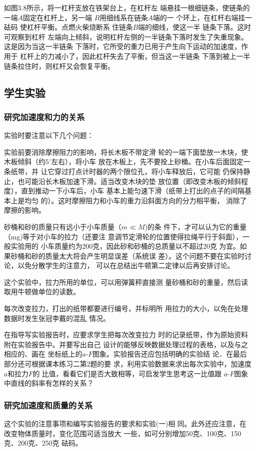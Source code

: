 如图3.8所示，将一杠杆支放在铁架台上，在杠杆左
端悬挂一根细链条，使链条的
一端$A$固定在杠杆上，另一端
$B$用细线系在链条$A$端的一
个环上，在杠杆右端挂一砝码
使杠杆平衡。点燃火柴烧断系
住链条$B$端的细线，使这一半
链条下落。这时可观察到杠杆
左端向上倾斜，说明杠杆左侧的一半链条下落时发生了失重现象。这是因为当这一半链条
下落时，它所受的重力已用于产生向下运动的加速度，作用于
杠杆上的力减小了，因此杠杆失去了平衡，但当这一半链条
下落到被上一半链条拉住时，则杠杆又会恢复平衡。

\subsection{学生实验}
\subsubsection{研究加速度和力的关系}
实验时要注意以下几个问题：

实验前要消除摩擦阻力的影响，将长木板不带定滑
轮的一端下面垫放一木块，使木板倾斜（约$5^{\circ}$左右），将小车
放在木板上，先不要拴上砂桶。在小车后面固定一条纸带，并
让它穿过打点计时器的两个限位孔，将小车释放后，它可能
仍保持静止，也可能沿长木板加速下滑。适当改变木块的垫
放位置（即改变木板的倾斜程度），直到推动一下小车后，小车
基本上能匀速下滑（纸带上打出的点子的间隔基本上是均匀
的）。这时摩擦阻力和小车的重力沿斜面方向的分力相平衡，
消除了摩擦的影响。

砂桶和砂的质量只有远小于小车质量（$m\ll M$)的条
件下，才可以认为它的重量（mg)等于对小车的拉力（还要注
意调节定滑轮的位置使得拉绳平行于斜面），一般实验用的
小车质量约为200克，因此砂和砂桶的总质量以不超过20克
为宜。如果砂桶和砂的质量太大将会产生明显误差（系统误
差）。这个问题不要在实验时讨论，以免分散学生的注意力，
可以在总结出牛顿第二定律以后再安排讨论。

这个实验中，拉力所用的单位，可以用弹簧秤直接测
量砂桶和砂的重量，然后读取用牛顿做单位的读数。

每次改变拉力，打出的纸带都要进行编号，并标明所
用拉力的大小，以免在处理数据时发生张冠李戴的混乱
情况。

在指导写实验报告时，应要求学生把每次改变拉力
时的记录纸带，作为原始资料附在实验报告中。并要写出自己
设计的能够反映数据处理过程的表格，以及与之相应的、画在
坐标纸上的$a$-$F$图象。实验报告还应包括明确的实验结
论．在最后部分还可根据课本练习二第2题的要
求，利用实验数据来求出每次实验中，加速度$a$和拉力$F$的
比值，看看它们是否大致相等，可启发学生思考这一比值跟
$a$-$F$图象中直线的斜率有怎样的关系？

\subsubsection{研究加速度和质量的关系}
这个实验的注意事项和编写实验报告的要求和实验(一)相
同。此外还应注意，在改变物体质量时，变化范围可适当放大
一些，如可分别增加50克、100克、150克、200克、250克
砝码。

